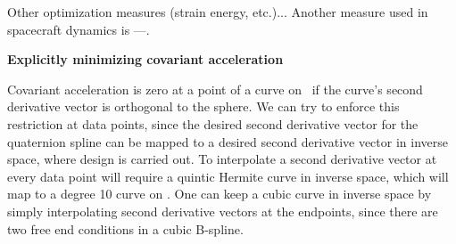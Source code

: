 Other optimization measures (strain energy, etc.)...
Another measure used in spacecraft dynamics is ---.

{\bf Explicitly minimizing covariant acceleration}

Covariant acceleration is zero at a point of a curve on \ if the curve's
second derivative vector is orthogonal to the sphere.
We can try to enforce this restriction at data points,
since the desired second derivative vector for the quaternion spline
can be mapped to a desired second derivative vector in inverse space,
where design is carried out.
To interpolate a second derivative vector at every data point will require
a quintic Hermite curve in inverse space, which will map to a degree 10
curve on .
One can keep a cubic curve in inverse space by simply interpolating
second derivative vectors at the endpoints, since there are two free
end conditions in a cubic B-spline.

